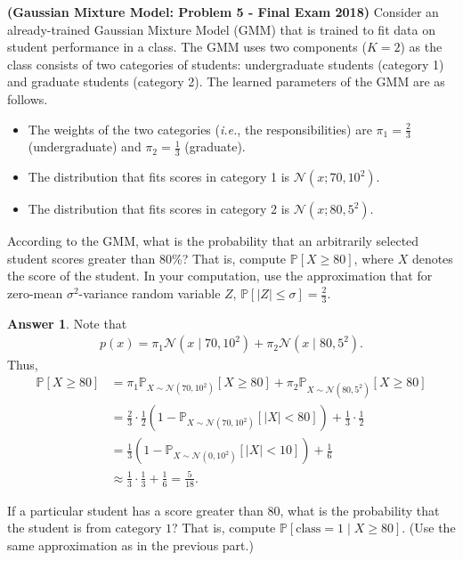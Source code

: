 \documentclass{article}
\newcommand{\probP}{\mathds{P}}
\theoremstyle{definition}
\newtheorem*{answer}{Answer}
\begin{document}
\begin{question}[start=1]
	\item \textbf{(Gaussian Mixture Model: Problem 5 - Final Exam 2018)} Consider an already-trained Gaussian Mixture Model (GMM) that is trained to fit data on student performance in a class. The GMM uses two components ($K = 2$) as the class consists of two categories of students: undergraduate students (category 1) and graduate students (category 2). The learned parameters of the GMM are as follows.
	\begin{itemize}
		\item The weights of the two categories (\textit{i.e.}, the responsibilities) are $\pi_1 = \frac{2}{3}$ (undergraduate) and $\pi_2 = \frac{1}{3}$ (graduate).
		\item The distribution that fits scores in category 1 is $\mathcal{N}\left(x; 70, 10^2\right)$.
		\item The distribution that fits scores in category 2 is $\mathcal{N}\left(x; 80, 5^2\right)$.
	\end{itemize}
	\begin{question}
		\item According to the GMM, what is the probability that an arbitrarily selected student scores greater than $80$\%? That is, compute $\probP[X \geq 80]$, where $X$ denotes the score of the student. In your computation, use the approximation that for zero-mean $\sigma^2$-variance random variable $Z$, $\probP[\mid\! Z\!\mid \leq \sigma] = \frac{2}{3}$.
		\begin{answer}
			Note that
			\begin{align*}
				p(x) = \pi_1 \mathcal{N}\left(x \mid 70, 10^2\right) + \pi_2 \mathcal{N}\left(x \mid 80, 5^2\right).
			\end{align*}
			Thus,
			\begin{align*}
				\probP[X \geq 80] &= \pi_1 \probP_{X \sim \mathcal{N}\left(70, 10^2\right)} [X \geq 80] + \pi_2 \probP_{X \sim \mathcal{N}\left(80, 5^2\right)}[X \geq 80]\\
				&=  \frac{2}{3} \cdot \frac{1}{2} \left(1 - \probP_{X \sim \mathcal{N}\left(70, 10^2\right)} [\mid\!X\!\mid < 80]\right) + \frac{1}{3} \cdot \frac{1}{2}\\
				&= \frac{1}{3} \left(1 - \probP_{X \sim \mathcal{N}\left(0, 10^2\right)} [\mid\!X\!\mid < 10]\right) + \frac{1}{6}\\
				&\approx \frac{1}{3} \cdot \frac{1}{3} + \frac{1}{6} = \frac{5}{18}.
			\end{align*}
		\end{answer}
		\item If a particular student has a score greater than $80$, what is the probability that the student is from category $1$? That is, compute $\probP[\text{class} = 1 \mid X \geq 80]$. (Use the same approximation as in the previous part.)

\end{question}
\end{question}
\end{document}
